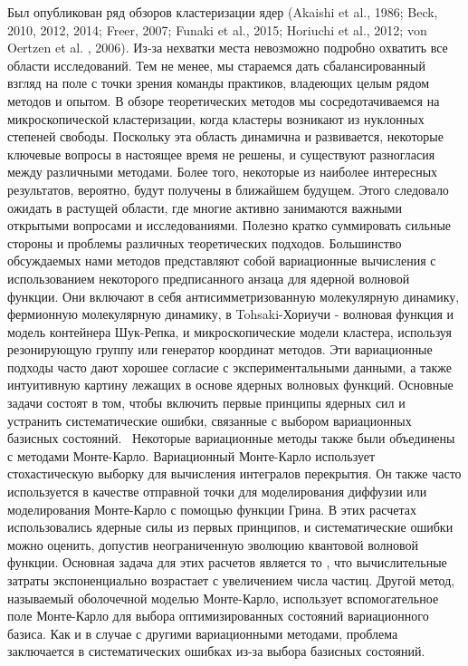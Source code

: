 \documentclass[fontsize=14pt]{scrarticle}
\begin{document}
Был опубликован ряд обзоров кластеризации ядер (Akaishi et al., 1986; Beck, 2010, 2012, 2014; Freer, 2007; Funaki et al., 2015; Horiuchi et al., 2012; von Oertzen et al. , 2006). Из-за нехватки места невозможно подробно охватить все области исследований. Тем не менее, мы стараемся дать сбалансированный взгляд на поле с точки зрения команды практиков, владеющих целым рядом методов и опытом. В обзоре теоретических методов мы сосредотачиваемся на микроскопической кластеризации, когда кластеры возникают из нуклонных степеней свободы. Поскольку эта область динамична и развивается, некоторые ключевые вопросы в настоящее время не решены, и существуют разногласия между различными методами. Более того, некоторые из наиболее интересных результатов, вероятно, будут получены в ближайшем будущем. Этого следовало ожидать в растущей области, где многие активно занимаются важными открытыми вопросами и исследованиями. Полезно кратко суммировать сильные стороны и проблемы различных теоретических подходов. Большинство обсуждаемых нами методов представляют собой вариационные вычисления с использованием некоторого предписанного анзаца для ядерной волновой функции. Они включают в себя антисимметризованную молекулярную динамику, фермионную молекулярную динамику, в Tohsaki-Хориучи - волновая функция и модель контейнера Шук-Репка, и микроскопические модели кластера, используя резонирующую группу или генератор координат методов. Эти вариационные подходы часто дают хорошее согласие с экспериментальными данными, а также интуитивную картину лежащих в основе ядерных волновых функций. Основные задачи состоят в том, чтобы включить первые принципы ядерных сил и устранить систематические ошибки, связанные с выбором вариационных базисных состояний.  
Некоторые вариационные методы также были объединены с методами Монте-Карло. Вариационный Монте-Карло использует стохастическую выборку для вычисления интегралов перекрытия. Он также часто используется в качестве отправной точки для моделирования диффузии или моделирования Монте-Карло с помощью функции Грина. В этих расчетах использовались ядерные силы из первых принципов, и систематические ошибки можно оценить, допустив неограниченную эволюцию квантовой волновой функции. Основная задача для этих расчетов является то , что вычислительные затраты экспоненциально возрастает с увеличением числа частиц. Другой метод, называемый оболочечной моделью Монте-Карло, использует вспомогательное поле Монте-Карло для выбора оптимизированных состояний вариационного базиса. Как и в случае с другими вариационными методами, проблема заключается в систематических ошибках из-за выбора базисных состояний. 
\end{document}
